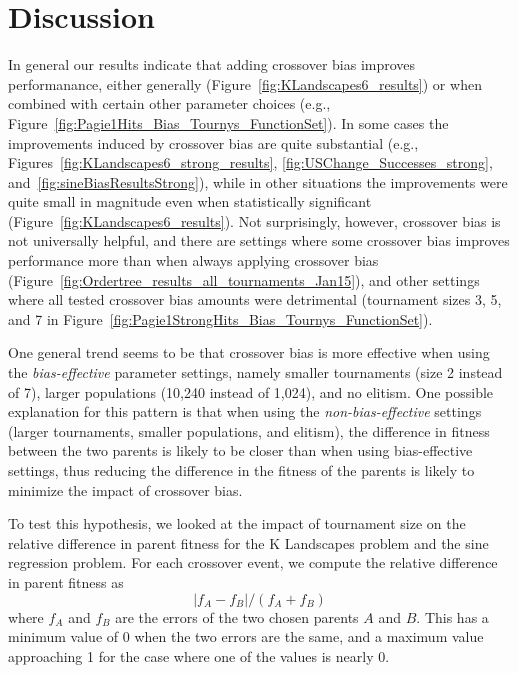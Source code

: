\documentclass{sig-alternate}
\begin{document}
\section{Discussion} \label{sec:Discussion}

In general our results indicate that adding crossover bias improves performanance, either generally
(Figure~\ref{fig:KLandscapes6_results}) or when combined with certain other parameter choices
(e.g., Figure~\ref{fig:Pagie1Hits_Bias_Tournys_FunctionSet}). In some cases the improvements
induced by crossover bias are quite substantial (e.g., Figures~\ref{fig:KLandscapes6_strong_results},
\ref{fig:USChange_Successes_strong}, and~\ref{fig:sineBiasResultsStrong}), while in other situations 
the improvements were quite small in magnitude even when statistically significant 
(Figure~\ref{fig:KLandscapes6_results}). Not surprisingly, however, crossover bias is not
universally helpful, and there are settings where some crossover bias improves performance more than
when always applying crossover bias (Figure~\ref{fig:Ordertree_results_all_tournaments_Jan15}), 
and other settings where all tested crossover bias amounts were detrimental 
(tournament sizes 3, 5, and 7 in Figure~\ref{fig:Pagie1StrongHits_Bias_Tournys_FunctionSet}).

One general trend seems to be that crossover bias is more effective when using the 
\emph{bias-effective} parameter settings, namely smaller tournaments (size 2 instead of 7), 
larger populations (10,240 instead of 1,024), and no elitism. One possible explanation for this
pattern is that when using the 
\emph{non-bias-effective} settings (larger tournaments, smaller populations, and elitism), 
the difference in fitness between the two parents is 
likely to be closer than when using bias-effective settings, thus
reducing the difference in the fitness of the parents is
likely to minimize the impact of crossover bias.


To test this hypothesis, we looked at the impact of tournament size on the relative difference
in parent fitness for the K Landscapes problem and the sine regression problem. For each
crossover event, we compute the relative difference in parent fitness as
\[
	|f_A - f_B| / (f_A + f_B)
\]
where $f_A$ and $f_B$ are the errors of the two chosen parents $A$ and $B$. 
This has a minimum value of 0 when the two errors are the same, 
and a maximum value approaching 1 for the case where one of the values is nearly 0.
\end{document}
